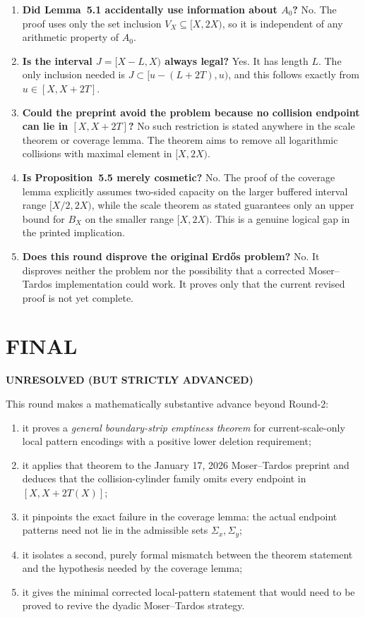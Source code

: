 \begin{enumerate}
\item \textbf{Did Lemma~5.1 accidentally use information about $A_0$?} No. The proof uses only the set inclusion $V_X\subseteq [X,2X)$, so it is independent of any arithmetic property of $A_0$.

\item \textbf{Is the interval $J=[X-L,X)$ always legal?} Yes. It has length $L$. The only inclusion needed is $J\subset [u-(L+2T),u)$, and this follows exactly from $u\in[X,X+2T]$.

\item \textbf{Could the preprint avoid the problem because no collision endpoint can lie in $[X,X+2T]$?} No such restriction is stated anywhere in the scale theorem or coverage lemma. The theorem aims to remove all logarithmic collisions with maximal element in $[X,2X)$.

\item \textbf{Is Proposition~5.5 merely cosmetic?} No. The proof of the coverage lemma explicitly assumes two-sided capacity on the larger buffered interval range $[X/2,2X)$, while the scale theorem as stated guarantees only an upper bound for $B_X$ on the smaller range $[X,2X)$. This is a genuine logical gap in the printed implication.

\item \textbf{Does this round disprove the original Erd\H{o}s problem?} No. It disproves neither the problem nor the possibility that a corrected Moser--Tardos implementation could work. It proves only that the current revised proof is not yet complete.
\end{enumerate}

\section{FINAL}

\textbf{UNRESOLVED (BUT STRICTLY ADVANCED)}

This round makes a mathematically substantive advance beyond Round-2:

\begin{enumerate}
\item it proves a \emph{general boundary-strip emptiness theorem} for current-scale-only local pattern encodings with a positive lower deletion requirement;
\item it applies that theorem to the January 17, 2026 Moser--Tardos preprint and deduces that the collision-cylinder family omits every endpoint in $[X,X+2T(X)]$;
\item it pinpoints the exact failure in the coverage lemma: the actual endpoint patterns need not lie in the admissible sets $\Sigma_x,\Sigma_y$;
\item it isolates a second, purely formal mismatch between the theorem statement and the hypothesis needed by the coverage lemma;
\item it gives the minimal corrected local-pattern statement that would need to be proved to revive the dyadic Moser--Tardos strategy.
\end{enumerate}

